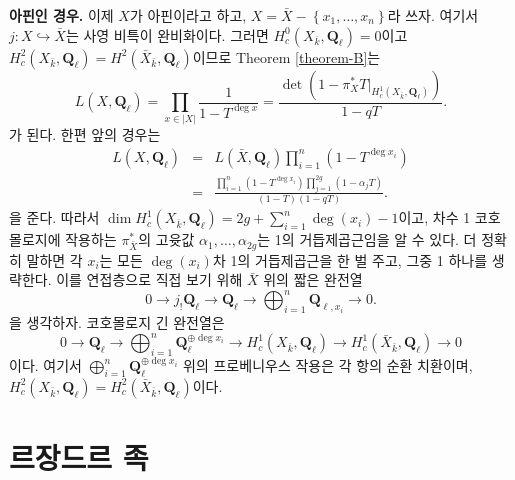 \medskip\noindent
{\bf 아핀인 경우.}
이제 $X$가 아핀이라고 하고,
$X= \bar X-\left\{x_1, \ldots, x_n\right\}$라 쓰자. 여기서
$j : X \hookrightarrow \bar X$는 사영 비특이 완비화이다. 그러면
$H_c^0(X_{\bar k}, \mathbf{Q}_\ell) = 0$이고 $H_c^2(X_{\bar k},
\mathbf{Q}_\ell) = H^2(\bar X_{\bar k}, \mathbf{Q}_\ell)$이므로
Theorem \ref{theorem-B}는
$$
L(X, \mathbf{Q}_\ell) = \prod_{x \in |X|}\frac{1}{1 - T^{\deg x}} =
\frac{\det(1-\pi_X^*T |_{H_c^1(X_{\bar k}, \mathbf{Q}_\ell)})}{1 - qT}.
$$
가 된다. 한편 앞의 경우는
\begin{eqnarray*}
L(X, \mathbf{Q}_\ell) & = & L(\bar X,
\mathbf{Q}_\ell)\prod_{i = 1}^n\left(1-T^{\deg x_i}\right) \\
& = & \frac{\prod_{i = 1}^n(1-T^{\deg
x_i})\prod_{j = 1}^{2g}(1-\alpha_jT)}{(1-T)(1-qT)}.
\end{eqnarray*}
을 준다. 따라서
$\dim H_c^1(X_{\bar k}, \mathbf{Q}_\ell) =
2g+\sum_{i = 1}^n \deg(x_i)-1$이고,
차수 1 코호몰로지에 작용하는 $\pi_{\bar X}^*$의 고윳값
$\alpha_1, \ldots, \alpha_{2g}$는 1의 거듭제곱근임을 알 수 있다.
더 정확히 말하면 각 $x_i$는 모든 $\deg(x_i)$차 1의 거듭제곱근을 한 벌
주고, 그중 1 하나를 생략한다. 이를 연접층으로 직접 보기 위해
$\bar X$ 위의 짧은 완전열
$$
0\to j_!\mathbf{Q}_\ell\to \mathbf{Q}_\ell\to\bigoplus_{i = 1}^n
\mathbf{Q}_{\ell, x_i}\to 0.
$$
을 생각하자. 코호몰로지 긴 완전열은
$$
0\to \mathbf{Q}_\ell \to \bigoplus_{i = 1}^n \mathbf{Q}_\ell^{\oplus \deg x_i}
\to H_c^1(X_{\bar k}, \mathbf{Q}_\ell) \to H_c^1(\bar X_{\bar k},
\mathbf{Q}_\ell)\to 0
$$
이다. 여기서 $\bigoplus_{i = 1}^n \mathbf{Q}_\ell^{\oplus
\deg x_i}$ 위의 프로베니우스 작용은 각 항의 순환 치환이며,
$H_c^2(X_{\bar k}, \mathbf{Q}_\ell) = H_c^2(\bar X_{\bar k}, \mathbf{Q}_\ell)$이다.



\section{르장드르 족}
\label{section-legendre-family}

